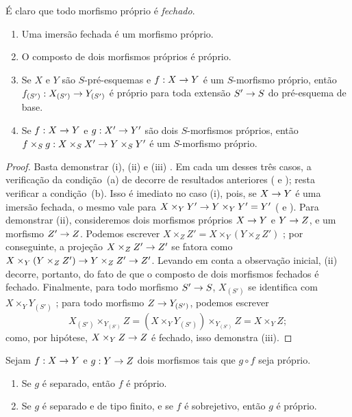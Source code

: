 \documentclass[oneside,10pt]{amsart}
\makeatletter
\newcommand{\ega@arrow}[2]{\mathchoice{#1}{#2}{#2}{#2}}
\renewcommand{\to}{\ega@arrow{\longrightarrow}{\rightarrow}}
\newcommand{\oldpage}[2][]{\marginnote{\normalfont\footnotesize\textbf{#1}~|~#2}\ignorespaces}
\let\EGAOriginalLabel\label
\renewcommand{\label}[1]{\phantomsection\EGAOriginalLabel{#1}}
\makeatother
\begin{document}
É claro que todo morfismo próprio é \emph{fechado}.

\begin{proposition}[5.4.2]
\label{II.5.4.2}
\medskip\noindent
\begin{enumerate}
  \item[{\rm(i)}] Uma imersão fechada é um morfismo próprio.
  \item[{\rm(ii)}] O composto de dois morfismos próprios é próprio.
  \item[{\rm(iii)}] Se $X$ e $Y$ são $S$-pré-esquemas e $f:X\to Y$ é um $S$-morfismo próprio, então $f_{(S')}:X_{(S')}\to Y_{(S')}$ é próprio para toda extensão $S'\to S$ do pré-esquema de base.
  \item[{\rm(iv)}] Se $f:X\to Y$ e $g:X'\to Y'$ são dois $S$-morfismos próprios, então $f\times_S g:X\times_S X'\to Y\times_S Y'$ é um $S$-morfismo próprio.
\end{enumerate}
\end{proposition}
\oldpage[II]{101}
\begin{proof}
Basta demonstrar (i), (ii) e (iii) .
Em cada um desses três casos, a verificação da condição~(a) de  decorre de resultados anteriores ( e ); resta verificar a condição~(b).
Isso é imediato no caso (i), pois, se $X\to Y$ é uma imersão fechada, o mesmo vale para $X\times_Y Y'\to Y\times_Y Y'=Y'$ ( e ).
Para demonstrar (ii), consideremos dois morfismos próprios $X\to Y$ e $Y\to Z$, e um morfismo $Z'\to Z$.
Podemos escrever $X\times_Z Z'=X\times_Y(Y\times_Z Z')$ ; por conseguinte, a projeção $X\times_Z Z'\to Z'$ se fatora como $X\times_Y(Y\times_Z Z')\to Y\times_Z Z'\to Z'$.
Levando em conta a observação inicial, (ii) decorre, portanto, do fato de que o composto de dois morfismos fechados é fechado.
Finalmente, para todo morfismo $S'\to S$, $X_{(S')}$ se identifica com $X\times_Y Y_{(S')}$ ; para todo morfismo $Z\to Y_{(S')}$, podemos escrever
\[
  X_{(S')}\times_{Y_{(S')}}Z=(X\times_Y Y_{(S')})\times_{Y_{(S')}}Z=X\times_Y Z;
\]
como, por hipótese, $X\times_Y Z\to Z$ é fechado, isso demonstra (iii).
\end{proof}

\begin{corollary}[5.4.3]
\label{II.5.4.3}
Sejam $f:X\to Y$ e $g:Y\to Z$ dois morfismos tais que $g\circ f$ seja próprio.
\begin{enumerate}
  \item[{\rm(i)}] Se $g$ é separado, então $f$ é próprio.
  \item[{\rm(ii)}] Se $g$ é separado e de tipo finito, e se $f$ é sobrejetivo, então $g$ é próprio.
\end{enumerate}
\end{corollary}
\end{document}
